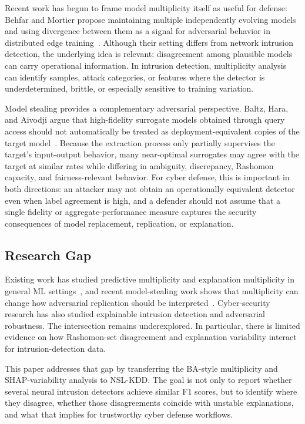 Recent work has begun to frame model multiplicity itself as useful for defense: Behfar and Mortier propose maintaining multiple independently evolving models and using divergence between them as a signal for adversarial behavior in distributed edge training~\cite{behfar2026model}. Although their setting differs from network intrusion detection, the underlying idea is relevant: disagreement among plausible models can carry operational information. In intrusion detection, multiplicity analysis can identify samples, attack categories, or features where the detector is underdetermined, brittle, or especially sensitive to training variation.

Model stealing provides a complementary adversarial perspective. Baltz, Hara, and Aivodji argue that high-fidelity surrogate models obtained through query access should not automatically be treated as deployment-equivalent copies of the target model~\cite{baltz2026model}. Because the extraction process only partially supervises the target's input-output behavior, many near-optimal surrogates may agree with the target at similar rates while differing in ambiguity, discrepancy, Rashomon capacity, and fairness-relevant behavior. For cyber defense, this is important in both directions: an attacker may not obtain an operationally equivalent detector even when label agreement is high, and a defender should not assume that a single fidelity or aggregate-performance measure captures the security consequences of model replacement, replication, or explanation.

\subsection{Research Gap}

Existing work has studied predictive multiplicity and explanation multiplicity in general ML settings~\cite{black2022model,marx2020predictive,brunet2022implications,laberge2023partial}, and recent model-stealing work shows that multiplicity can change how adversarial replication should be interpreted~\cite{baltz2026model}. Cyber-security research has also studied explainable intrusion detection and adversarial robustness. The intersection remains underexplored. In particular, there is limited evidence on how Rashomon-set disagreement and explanation variability interact for intrusion-detection data.

This paper addresses that gap by transferring the BA-style multiplicity and SHAP-variability analysis to NSL-KDD. The goal is not only to report whether several neural intrusion detectors achieve similar F1 scores, but to identify where they disagree, whether those disagreements coincide with unstable explanations, and what that implies for trustworthy cyber defense workflows.
